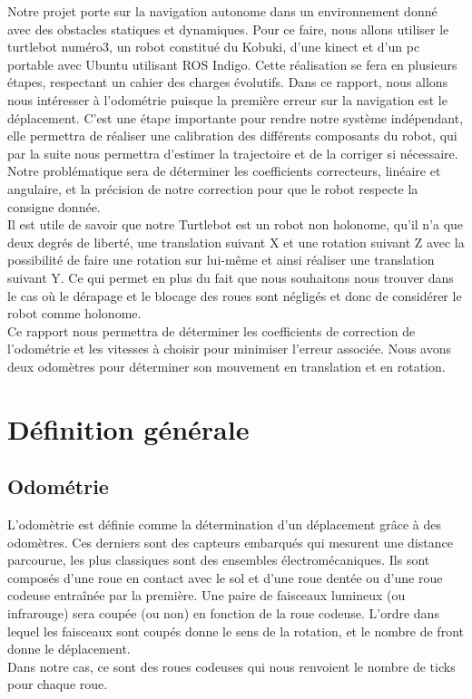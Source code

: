 \documentclass[10pt,a4paper]{article}
\begin{document}
Notre projet porte sur la navigation autonome dans un environnement donné avec des obstacles statiques et dynamiques. Pour ce faire, nous allons utiliser le turtlebot numéro3, un robot constitué du Kobuki, d'une kinect et d'un pc portable avec Ubuntu utilisant ROS Indigo. Cette réalisation se fera en plusieurs étapes, respectant un cahier des charges évolutifs. Dans ce rapport, nous allons nous intéresser à l'odométrie puisque la première erreur sur la navigation est le déplacement. C'est une étape importante pour rendre notre système indépendant, elle permettra de réaliser une calibration des différents composants du robot, qui par la suite nous permettra d'estimer la trajectoire et de la corriger si nécessaire.\\
Notre problématique sera de déterminer les coefficients correcteurs, linéaire et angulaire, et la précision de notre correction pour que le robot respecte la consigne donnée.\\
Il est utile de savoir que notre Turtlebot est un robot non holonome, qu'il n'a que deux degrés de liberté, une translation suivant X et une rotation suivant Z avec la possibilité de faire une rotation sur lui-même et ainsi réaliser une translation suivant Y. Ce qui permet en plus du fait que nous souhaitons nous trouver dans le cas où le dérapage et le blocage des roues sont négligés et donc de considérer le robot comme holonome.\\
Ce rapport nous permettra de déterminer les coefficients de correction de l'odométrie et les vitesses à choisir pour minimiser l'erreur associée. Nous avons deux odomètres pour déterminer son mouvement en translation et en rotation.\\



\section{Définition générale}

\subsection{Odométrie}
L’odomètrie est définie comme la détermination d’un déplacement grâce à des odomètres. Ces derniers sont des capteurs embarqués qui mesurent une distance parcourue, les plus classiques sont des ensembles électromécaniques. Ils sont composés d’une roue en contact avec le sol et d’une roue dentée ou d'une roue codeuse entraînée par la première. Une paire de faisceaux lumineux (ou infrarouge) sera coupée (ou non) en fonction de la roue codeuse. L’ordre dans lequel les faisceaux sont coupés donne le sens de la rotation, et le nombre de front donne le déplacement.\\
Dans notre cas, ce sont des roues codeuses qui nous renvoient le  nombre de ticks pour chaque roue.\\
\end{document}
